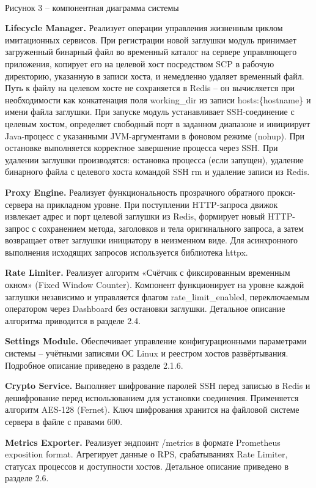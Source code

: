 \documentclass[
]{article}
\begin{document}
\\
Рисунок 3 -- компонентная диаграмма системы

\textbf{Lifecycle Manager.} Реализует операции управления жизненным
циклом имитационных сервисов. При регистрации новой заглушки модуль
принимает загруженный бинарный файл во временный каталог на сервере
управляющего приложения, копирует его на целевой хост посредством SCP в
рабочую директорию, указанную в записи хоста, и немедленно удаляет
временный файл. Путь к файлу на целевом хосте не сохраняется в Redis --
он вычисляется при необходимости как конкатенация поля working\_dir из
записи hosts:\{hostname\} и имени файла заглушки. При запуске модуль
устанавливает SSH-соединение с целевым хостом, определяет свободный порт
в заданном диапазоне и инициирует Java-процесс с указанными
JVM-аргументами в фоновом режиме (nohup). При остановке выполняется
корректное завершение процесса через SSH. При удалении заглушки
производятся: остановка процесса (если запущен), удаление бинарного
файла с целевого хоста командой SSH rm и удаление записи из Redis.

\textbf{Proxy Engine.} Реализует функциональность прозрачного обратного
прокси-сервера на прикладном уровне. При поступлении HTTP-запроса движок
извлекает адрес и порт целевой заглушки из Redis, формирует новый
HTTP-запрос с сохранением метода, заголовков и тела оригинального
запроса, а затем возвращает ответ заглушки инициатору в неизменном виде.
Для асинхронного выполнения исходящих запросов используется библиотека
httpx.

\textbf{Rate Limiter.} Реализует алгоритм «Счётчик с фиксированным
временным окном» (Fixed Window Counter). Компонент функционирует на
уровне каждой заглушки независимо и управляется флагом
rate\_limit\_enabled, переключаемым оператором через Dashboard без
остановки заглушки. Детальное описание алгоритма приводится в разделе
2.4.

\textbf{Settings Module.} Обеспечивает управление конфигурационными
параметрами системы -- учётными записями ОС Linux и реестром хостов
развёртывания. Подробное описание приведено в разделе 2.1.6.

\textbf{Crypto Service.} Выполняет шифрование паролей SSH перед записью
в Redis и дешифрование перед использованием для установки соединения.
Применяется алгоритм AES-128 (Fernet). Ключ шифрования хранится на
файловой системе сервера в файле с правами 600.

\textbf{Metrics Exporter.} Реализует эндпоинт /metrics в формате
Prometheus exposition format. Агрегирует данные о RPS, срабатываниях
Rate Limiter, статусах процессов и доступности хостов. Детальное
описание приведено в разделе 2.6.
\end{document}
